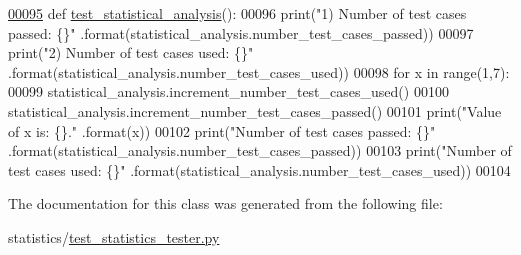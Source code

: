 \begin{DoxyCode}
\hypertarget{classstatistics_1_1test__statistics__tester_1_1statistical__analysis__tester_l00095}{}\hyperlink{classstatistics_1_1test__statistics__tester_1_1statistical__analysis__tester_ad05a0d6e83aaba083bfba6212ec0b971}{00095}     \textcolor{keyword}{def }\hyperlink{classstatistics_1_1test__statistics__tester_1_1statistical__analysis__tester_ad05a0d6e83aaba083bfba6212ec0b971}{test\_statistical\_analysis}():
00096         print(\textcolor{stringliteral}{"1) Number of test cases passed:  \{\}"} .format(statistical\_analysis.number\_test\_cases\_passed))
00097         print(\textcolor{stringliteral}{"2) Number of test cases used:    \{\}"} .format(statistical\_analysis.number\_test\_cases\_used))
00098         \textcolor{keywordflow}{for} x \textcolor{keywordflow}{in} range(1,7):
00099             statistical\_analysis.increment\_number\_test\_cases\_used()
00100             statistical\_analysis.increment\_number\_test\_cases\_passed()
00101             print(\textcolor{stringliteral}{"Value of x is: \{\}."} .format(x))
00102             print(\textcolor{stringliteral}{"Number of test cases passed: \{\}"} .format(statistical\_analysis.number\_test\_cases\_passed))
00103             print(\textcolor{stringliteral}{"Number of test cases used:   \{\}"} .format(statistical\_analysis.number\_test\_cases\_used))
00104 \end{DoxyCode}


The documentation for this class was generated from the following file\+:\begin{DoxyCompactItemize}
\item 
statistics/\hyperlink{test__statistics__tester_8py}{test\+\_\+statistics\+\_\+tester.\+py}\end{DoxyCompactItemize}
